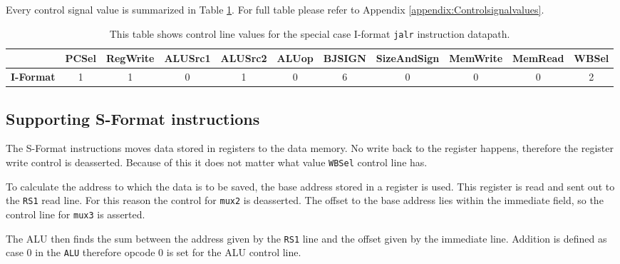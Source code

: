             Every control signal value is summarized in Table \ref{table:JALRFORMAT}. For full table please refer to Appendix \ref{appendix:Controlsignalvalues}.
            
            \begin{table}[h!]
                \small
                \hspace{-2.4cm}
                \begin{tabular}{|c||c|c|c|c|c|c|c|c|c|c|}
                	\hline
                	                  & \textbf{PCSel} & \textbf{RegWrite} & \textbf{ALUSrc1} & \textbf{ALUSrc2} & \textbf{ALUop} & \textbf{BJSIGN} & \textbf{SizeAndSign} & \textbf{MemWrite} & \textbf{MemRead} & \textbf{WBSel} \\ \hline\hline
                	\textbf{I-Format} &       1        &         1         &        0         &        1         &       0        &        6        &         0          &         0         &        0         &       2        \\ \hline
                \end{tabular}
                \caption{This table shows control line values for the special case I-format \texttt{jalr} instruction datapath. }
                \label{table:JALRFORMAT}
            \end{table}
        
    
    \subsection{Supporting S-Format instructions}
        The S-Format instructions moves data stored in registers to the data memory. No write back to the register happens, therefore the register write control is deasserted. Because of this it does not matter what value \texttt{WBSel} control line has. 
        
        To calculate the address to which the data is to be saved, the base address stored in a register is used. This register is read and sent out to the \texttt{RS1} read line. For this reason the control for \texttt{mux2} is deasserted. The offset to the base address lies within the immediate field, so the control line for \texttt{mux3} is asserted.
        
        The ALU then finds the sum between the address given by the \texttt{RS1} line and the offset given by the immediate line. Addition is defined as case 0 in the \texttt{ALU} therefore opcode 0 is set for the ALU control line.
        
